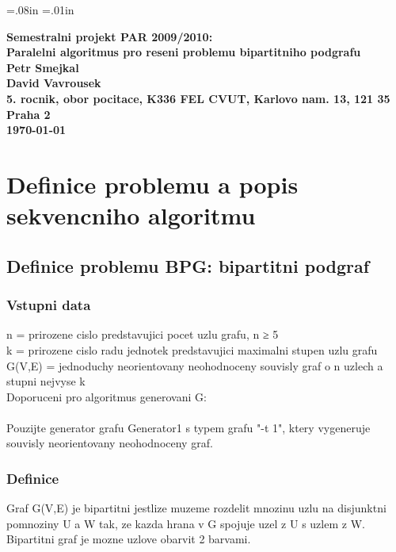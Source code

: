  \oddsidemargin=-5mm
\evensidemargin=-5mm\marginparwidth=.08in \marginparsep=.01in
\marginparpush=5pt\topmargin=-15mm\headheight=12pt
\headsep=25pt\footheight=12pt \footskip=30pt\textheight=25cm
\textwidth=17cm\columnsep=2mm
\columnseprule=1pt\parindent=15pt\parskip=2pt


\begin{center}
\bf Semestralni projekt PAR 2009/2010:\\[5mm]
    Paralelni algoritmus pro reseni problemu bipartitniho podgrafu\\[5mm] 
       Petr Smejkal\\
       David Vavrousek\\[2mm]
5. rocnik, obor pocitace, K336 FEL CVUT, Karlovo nam. 13, 121 35 Praha 2\\[2mm]
\today
\end{center}

\section{Definice problemu a popis sekvencniho algoritmu}


\subsection{Definice problemu BPG: bipartitni podgraf}


\subsubsection{Vstupni data}

n = prirozene cislo predstavujici pocet uzlu grafu, n ≥ 5\\
k = prirozene cislo radu jednotek predstavujici maximalni stupen uzlu grafu\\
G(V,E) = jednoduchy neorientovany neohodnoceny souvisly graf o n uzlech a stupni nejvyse k\\
Doporuceni pro algoritmus generovani G:\\
\\
Pouzijte generator grafu Generator1 s typem grafu "-t 1", ktery vygeneruje souvisly neorientovany neohodnoceny graf.
\subsubsection{Definice}

Graf G(V,E) je bipartitni jestlize muzeme rozdelit mnozinu uzlu na disjunktni pomnoziny U a W tak, ze kazda hrana v G spojuje uzel z U s uzlem z W. Bipartitni graf je mozne uzlove obarvit 2 barvami.
